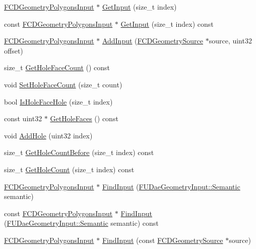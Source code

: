 \begin{DoxyCompactItemize}
\item 
\hyperlink{classFCDGeometryPolygonsInput}{FCDGeometryPolygonsInput} $\ast$ \hyperlink{classFCDGeometryPolygons_ae94dd6808541c432efe36603a29829a1}{GetInput} (size\_\-t index)
\item 
const \hyperlink{classFCDGeometryPolygonsInput}{FCDGeometryPolygonsInput} $\ast$ \hyperlink{classFCDGeometryPolygons_aa9454a8d2242abcd8e24006fe9f2a5fe}{GetInput} (size\_\-t index) const 
\item 
\hyperlink{classFCDGeometryPolygonsInput}{FCDGeometryPolygonsInput} $\ast$ \hyperlink{classFCDGeometryPolygons_a47f70b59744844bef7447e0d24d4aec1}{AddInput} (\hyperlink{classFCDGeometrySource}{FCDGeometrySource} $\ast$source, uint32 offset)
\item 
size\_\-t \hyperlink{classFCDGeometryPolygons_a7e4de0fd24ea0c147f703ac93c93e9dc}{GetHoleFaceCount} () const 
\item 
void \hyperlink{classFCDGeometryPolygons_a71e5e996ffb5d85b68be0281b45b0bd9}{SetHoleFaceCount} (size\_\-t count)
\item 
bool \hyperlink{classFCDGeometryPolygons_a5f7bc84ef2af68d4f29224ee258df4dd}{IsHoleFaceHole} (size\_\-t index)
\item 
const uint32 $\ast$ \hyperlink{classFCDGeometryPolygons_a0adb9be33e614e882fd7a78ed2c51511}{GetHoleFaces} () const 
\item 
void \hyperlink{classFCDGeometryPolygons_ad61ebb862bc1270ab634e0f7040ee1ed}{AddHole} (uint32 index)
\item 
size\_\-t \hyperlink{classFCDGeometryPolygons_a85b525e0279d57163aad34a55351c712}{GetHoleCountBefore} (size\_\-t index) const 
\item 
size\_\-t \hyperlink{classFCDGeometryPolygons_a58580909c79acac0342ac8b000b1d125}{GetHoleCount} (size\_\-t index) const 
\item 
\hyperlink{classFCDGeometryPolygonsInput}{FCDGeometryPolygonsInput} $\ast$ \hyperlink{classFCDGeometryPolygons_aacd4feab6b8f68030a2a391bcdc3129c}{FindInput} (\hyperlink{namespaceFUDaeGeometryInput_a0f887d29f54b10338ebcf73789a7a061}{FUDaeGeometryInput::Semantic} semantic)
\item 
const \hyperlink{classFCDGeometryPolygonsInput}{FCDGeometryPolygonsInput} $\ast$ \hyperlink{classFCDGeometryPolygons_a8bcccc4fbf784081dc3b9ae162594c9c}{FindInput} (\hyperlink{namespaceFUDaeGeometryInput_a0f887d29f54b10338ebcf73789a7a061}{FUDaeGeometryInput::Semantic} semantic) const 
\item 
\hyperlink{classFCDGeometryPolygonsInput}{FCDGeometryPolygonsInput} $\ast$ \hyperlink{classFCDGeometryPolygons_a7edacd157bec17fd6aba319a751446a9}{FindInput} (const \hyperlink{classFCDGeometrySource}{FCDGeometrySource} $\ast$source)

\end{DoxyCompactItemize}
